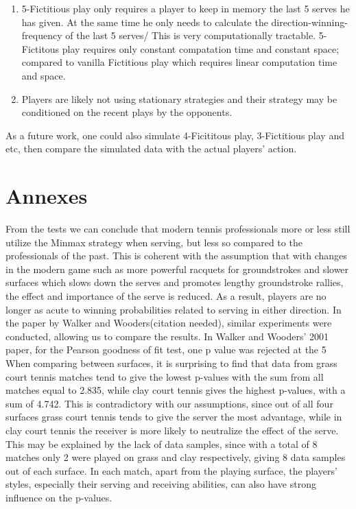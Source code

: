 \documentclass[11pt]{article}
\begin{document}
\begin{enumerate}
\item 5-Fictitious play only requires a player to keep in memory the last 5 serves he has given. At the same time he only needs to calculate the direction-winning-frequency of the last 5 serves/ This is very computationally tractable. 5-Fictitous play requires only constant compatation time and constant space; compared to vanilla Fictitious play which requires linear computation time and space.
\item Players are likely not using stationary strategies and their strategy may be conditioned on the recent plays by the opponents. 
\end{enumerate}

As a future work, one could also simulate 4-Ficititous play, 3-Fictitious play and etc, then compare the simulated data with the actual players' action. 

\section{Annexes}
From the tests we can conclude that modern tennis professionals more or less still utilize the Minmax strategy when serving, but less so compared to the professionals of the past. This is coherent with the assumption that with changes in the modern game such as more powerful racquets for groundstrokes and slower surfaces which slows down the serves and promotes lengthy groundstroke rallies, the effect and importance of the serve is reduced. As a result, players are no longer as acute to winning probabilities related to serving in either direction. In the paper by Walker and Wooders(citation needed), similar experiments were conducted, allowing us to compare the results.  In Walker and Wooders’ 2001 paper, for the Pearson goodness of fit test, one p value was rejected at the 5%
When comparing between surfaces, it is surprising to find that data from grass court tennis matches tend to give the lowest p-values with the sum from all matches equal to 2.835, while clay court tennis gives the highest p-values, with a sum of 4.742. This is contradictory with our assumptions, since out of all four surfaces grass court tennis tends to give the server the most advantage, while in clay court tennis the receiver is more likely to neutralize the effect of the serve. This may be explained by the lack of data samples, since with a total of 8 matches only 2 were played on grass and clay respectively, giving 8 data samples out of each surface. In each match, apart from the playing surface, the players’ styles, especially their serving and receiving abilities, can also have strong influence on the p-values.
\end{document}
